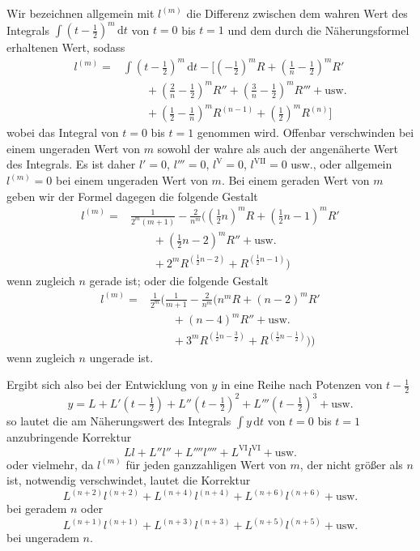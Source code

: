Wir bezeichnen allgemein mit $l^{(m)}$ die Differenz zwischen dem wahren Wert des Integrals $\int(t-\frac12)^m\,\mathrm{d}t$ von $t=0$ bis $t=1$ und dem durch die Näherungsformel erhaltenen Wert, sodass
\[
\begin{aligned}
l^{(m)}={}&\int(t-\tfrac12)^m\,\mathrm{d}t
-\bigl[(-\tfrac12)^mR+(\tfrac1n-\tfrac12)^mR'
\\ &\qquad +(\tfrac2n-\tfrac12)^mR''+(\tfrac3n-\tfrac12)^mR'''+\text{usw.}\\
&\qquad +(\tfrac12-\tfrac1n)^mR^{(n-1)}+(\tfrac12)^mR^{(n)}\bigr]
\end{aligned}
\]
wobei das Integral von $t=0$ bis $t=1$ genommen wird. Offenbar verschwinden bei einem ungeraden Wert von $m$ sowohl der wahre als auch der angenäherte Wert des Integrals. Es ist daher $l'=0$, $l'''=0$, $l^{\mathrm{V}}=0$, $l^{\mathrm{VII}}=0$ usw., oder allgemein $l^{(m)}=0$ bei einem ungeraden Wert von $m$. Bei einem geraden Wert von $m$ geben wir der Formel dagegen die folgende Gestalt
\[
\begin{aligned}
l^{(m)}={}&\frac1{2^m(m+1)}-\frac2{n^m}\bigl((\tfrac12n)^mR
+(\tfrac12n-1)^mR'\\ &\qquad +(\tfrac12n-2)^mR''+\text{usw.}\\
&\qquad +2^mR^{(\frac12n-2)}+R^{(\frac12n-1)}\bigr)
\end{aligned}
\]
wenn zugleich $n$ gerade ist; oder die folgende Gestalt
\[
\begin{aligned}
l^{(m)}={}&\frac1{2^m}\bigl(\frac1{m+1}-\frac2{n^m}\bigl(n^mR
+(n-2)^mR'\\ &\qquad +(n-4)^mR''+\text{usw.}\\
&\qquad +3^mR^{(\frac12n-\frac32)}+R^{(\frac12n-\frac12)}\bigr)\bigr)
\end{aligned}
\]
wenn zugleich $n$ ungerade ist.
\par{}
Ergibt sich also bei der Entwicklung von $y$ in eine Reihe nach Potenzen von $t-\frac12$
\[
y=L+L'(t-\tfrac12)+L''(t-\tfrac12)^2+L'''(t-\tfrac12)^3+\text{usw.}
\]
so lautet die am Näherungswert des Integrals $\int y\,\mathrm{d}t$ von $t=0$ bis $t=1$ anzubringende Korrektur
\[
Ll+L''l''+L''''l''''+L^{\mathrm{VI}}l^{\mathrm{VI}}+\text{usw.}
\]
oder vielmehr, da $l^{(m)}$ für jeden ganzzahligen Wert von $m$, der nicht größer als $n$ ist, notwendig verschwindet, lautet die Korrektur
\[
L^{(n+2)}l^{(n+2)}+L^{(n+4)}l^{(n+4)}+L^{(n+6)}l^{(n+6)}+\text{usw.}
\]
bei geradem $n$ oder
\[
L^{(n+1)}l^{(n+1)}+L^{(n+3)}l^{(n+3)}+L^{(n+5)}l^{(n+5)}+\text{usw.}
\]
bei ungeradem $n$.

